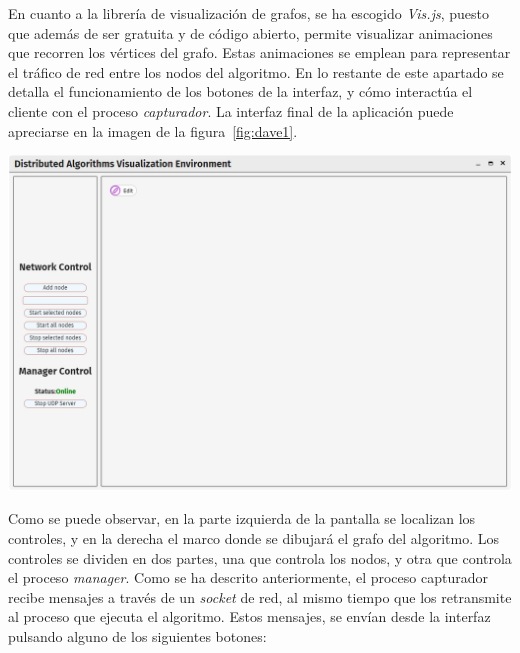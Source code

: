 En cuanto a la librería de visualización de grafos, se ha escogido \textit{Vis.js}\cite{visjs}, puesto que además de ser gratuita y de código abierto, permite visualizar animaciones que recorren los vértices del grafo. Estas animaciones se emplean para representar el tráfico de red entre los nodos del algoritmo. En lo restante de este apartado se detalla el funcionamiento de los botones de la interfaz, y cómo interactúa el cliente con el proceso \textit{capturador}. La interfaz final de la aplicación puede apreciarse en la imagen de la figura~\ref{fig:dave1}.

{
\centering
\includegraphics[width=0.9\linewidth]{imagenes/dave1}
\label{fig:dave1}
}

Como se puede observar, en la parte izquierda de la pantalla se localizan los controles, y en la derecha el marco donde se dibujará el grafo del algoritmo. Los controles se dividen en dos partes, una que controla los nodos, y otra que controla el proceso \textit{manager}. Como se ha descrito anteriormente, el proceso capturador recibe mensajes a través de un \textit{socket} de red, al mismo tiempo que los retransmite al proceso que ejecuta el algoritmo. Estos mensajes, se envían desde la interfaz pulsando alguno de los siguientes botones:

\newpage

